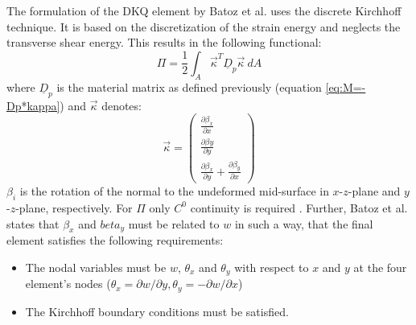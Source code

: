  The formulation of the DKQ element by Batoz et al. \cite{batoz1982evaluation} uses the discrete Kirchhoff technique. It is based on the discretization of the strain energy and neglects the transverse shear energy. This results in the following functional:
  \begin{equation}
  \Pi = \frac{1}{2} \int_A \vec{\kappa}^T \underline{D}_p \vec{\kappa}\ d\!A
  \end{equation}
  where $\underline{D}_p$ is the material matrix as defined previously (equation \ref{eq:M=-Dp*kappa}) and $\vec{\kappa}$ denotes:
  \begin{equation}
  \vec{\kappa} = \begin{pmatrix}
  \frac{\partial \beta_x}{\partial x}\\
  \frac{\partial \beta y}{\partial y}\\
  \frac{\partial \beta_x}{\partial y} + \frac{\partial \beta_y}{\partial x}
  \end{pmatrix}
  \end{equation}
  $\beta_i$ is the rotation of the normal to the undeformed mid-surface in $x$-$z$-plane and $y$-$z$-plane, respectively. For $\Pi$ only $C^0$ continuity is required \cite{batoz1982evaluation}. Further, Batoz et al. states that $\beta_x$ and $beta_y$ must be related to $w$ in such a way, that the final element satisfies the following requirements:
  \begin{itemize}
  	\item The nodal variables must be $w$, $\theta_x$ and $\theta_y$ with respect to $x$ and $y$ at the four element's nodes ($\theta_x = \partial w/\partial y, \theta_y=-\partial w/\partial x$)
  	\item The Kirchhoff boundary conditions must be satisfied.
  \end{itemize}
      

